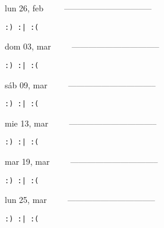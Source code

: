\documentclass[letterpaper,10pt]{article}
\begin{document}
\begin{multicols}{3}
{lun 26, feb\ \ \ \ \ --------------------------------}
\begin{flushright}\begin{small}\texttt{:) :| :(}\end{small}\end{flushright}
\vfill
{dom 03, mar\ \ \ \ \ --------------------------------}
\begin{flushright}\begin{small}\texttt{:) :| :(}\end{small}\end{flushright}\par
\vfill
{sáb 09, mar\ \ \ \ \ --------------------------------}
\begin{flushright}\begin{small}\texttt{:) :| :(}\end{small}\end{flushright}\par
\vfill
\end{multicols}
\vspace{1.05cm}

\begin{multicols}{3}
{mie 13, mar\ \ \ \ \ --------------------------------}
\begin{flushright}\begin{small}\texttt{:) :| :(}\end{small}\end{flushright}
\vfill
{mar 19, mar\ \ \ \ \ --------------------------------}
\begin{flushright}\begin{small}\texttt{:) :| :(}\end{small}\end{flushright}\par
\vfill
{lun 25, mar\ \ \ \ \ --------------------------------}
\begin{flushright}\begin{small}\texttt{:) :| :(}\end{small}\end{flushright}\par
\vfill
\end{multicols}
\vspace{1.05cm}
\end{document}
